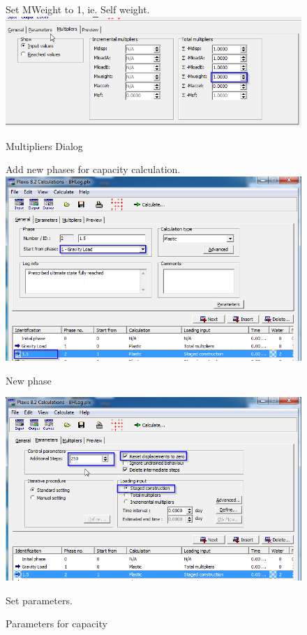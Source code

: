 \begin{landscape}
\begin{figure}[hbtp]
  \vfill
  \centering
  \begin{minipage}[c]{0.35\linewidth}
    \vfill
	Set MWeight to 1, ie. Self weight.
    \includegraphics[width=\linewidth, height=0.7\textheight,keepaspectratio]{images/plx/a (15).png}
    \caption{Multipliers Dialog}
    \vfill
	Add new phases for capacity calculation.
    \includegraphics[width=\linewidth, height=0.3\textheight,keepaspectratio]{images/plx/a (16).png}
    \caption{New phase}
    \vfill
  \end{minipage}
  \hfill
  \begin{minipage}[c]{0.6\linewidth}
  \includegraphics[width=\linewidth, height=0.8\textheight,keepaspectratio]{images/plx/a (17).png}
  \caption{Parameters for capacity}
  Set parameters.
  \end{minipage}
\vfill
\end{figure}
\end{landscape}
\pagebreak

